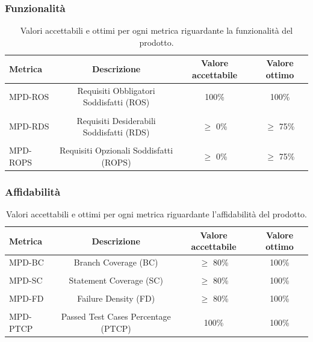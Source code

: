 \documentclass[8pt]{article}
\begin{document}
\subsubsection{Funzionalità}
\begin{table}[H]	
	\centering
	\begin{tabular}{lccc}
		\toprule
		\textbf{Metrica}& \textbf{Descrizione} & \textbf{Valore accettabile} & \textbf{Valore ottimo} \\
		\midrule
		MPD-ROS& Requisiti Obbligatori Soddisfatti (ROS) & 100\% & 100\%\\\\
		MPD-RDS & Requisiti Desiderabili Soddisfatti (RDS) & $\geq$ 0\% & $\geq$ 75\% \\\\
		MPD-ROPS & Requisiti Opzionali Soddisfatti (ROPS) & $\geq$ 0\% & $\geq$ 75\% \\
		\bottomrule
	\end{tabular}
	\caption{Valori accettabili e ottimi per ogni metrica riguardante la funzionalità del prodotto.}
	\label{table:Valori accettabili e ottimi per ogni metrica riguardante la funzionalità del prodotto.}
\end{table}
\subsubsection{Affidabilità}
\begin{table}[H]	
	\centering
	\begin{tabular}{lccc}
		\toprule
		\textbf{Metrica}& \textbf{Descrizione} & \textbf{Valore accettabile} & \textbf{Valore ottimo} \\
		\midrule
		MPD-BC & Branch Coverage (BC) & $\geq$ 80\% & 100\%\\\\
		MPD-SC & Statement Coverage (SC) & $\geq$ 80\% & 100\% \\\\
		MPD-FD & Failure Density (FD) & $\geq$ 80\% & 100\% \\\\
		MPD-PTCP & Passed Test Cases Percentage (PTCP) & 100\%  & 100\% \\
		\bottomrule
	\end{tabular}
	\caption{Valori accettabili e ottimi per ogni metrica riguardante l’affidabilità del prodotto.}
	\label{table:Valori accettabili e ottimi per ogni metrica riguardante l’affidabilità del prodotto.}
\end{table}
\end{document}
